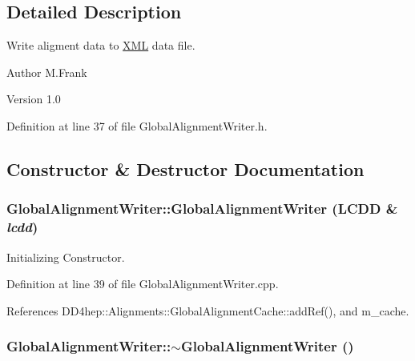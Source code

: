 \subsection{Detailed Description}
Write aligment data to \hyperlink{namespace_d_d4hep_1_1_x_m_l}{XML} data file. \begin{DoxyAuthor}{Author}
M.Frank 
\end{DoxyAuthor}
\begin{DoxyVersion}{Version}
1.0 
\end{DoxyVersion}


Definition at line 37 of file GlobalAlignmentWriter.h.

\subsection{Constructor \& Destructor Documentation}
\hypertarget{class_d_d4hep_1_1_alignments_1_1_global_alignment_writer_a11a20b65cc5391ee6b6f77cb38fb5703}{
\subsubsection[{GlobalAlignmentWriter}]{\setlength{\rightskip}{0pt plus 5cm}GlobalAlignmentWriter::GlobalAlignmentWriter (LCDD \& {\em lcdd})}}
\label{class_d_d4hep_1_1_alignments_1_1_global_alignment_writer_a11a20b65cc5391ee6b6f77cb38fb5703}


Initializing Constructor. 

Definition at line 39 of file GlobalAlignmentWriter.cpp.

References DD4hep::Alignments::GlobalAlignmentCache::addRef(), and m\_\-cache.\hypertarget{class_d_d4hep_1_1_alignments_1_1_global_alignment_writer_ac88d52ba1f9f66cd93b65b9464c9fd92}{
\subsubsection[{$\sim$GlobalAlignmentWriter}]{\setlength{\rightskip}{0pt plus 5cm}GlobalAlignmentWriter::$\sim$GlobalAlignmentWriter ()}}
\label{class_d_d4hep_1_1_alignments_1_1_global_alignment_writer_ac88d52ba1f9f66cd93b65b9464c9fd92}


